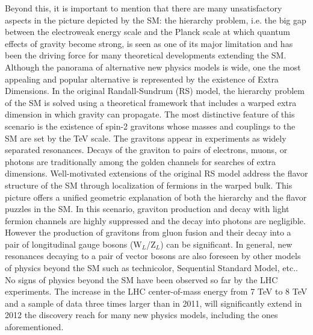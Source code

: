 \documentclass[10pt, a4paper]{article}
\begin{document}
Beyond this, it is important to mention that there are many unsatisfactory 
aspects in the picture depicted by the SM: the hierarchy problem, i.e. the big 
gap between the electroweak energy scale and the Planck scale at which 
quantum effects of gravity become strong, is seen as one of its major limitation 
and has been the driving force for many theoretical developments extending the 
SM. Although the panorama of alternative new physics models is wide, one the 
most appealing and popular alternative is represented by the existence of Extra Dimensions. 
In the original Randall-Sundrum (RS) model, the hierarchy problem
of the SM is solved using a theoretical framework that includes a warped extra dimension
in which gravity can propagate. 
The most distinctive feature of this scenario is the existence of spin-2 gravitons
whose masses and couplings to the SM are set by the TeV scale. The gravitons 
appear in experiments as widely separated resonances. 
Decays of the graviton to pairs of electrons, muons, or photons are traditionally among 
the golden channels for searches of extra dimensions.
Well-motivated extensions of the original RS model address the flavor structure of the SM through 
localization of fermions in the warped bulk. This picture offers a unified geometric explanation 
of both the hierarchy and the flavor puzzles in the SM.
In this scenario, graviton production and decay with light fermion channels are 
highly suppressed and the decay into photons are negligible. 
However the production of gravitons from gluon fusion and 
their decay into a pair of longitudinal gauge bosons (W$_L$/Z$_L$) can be significant.
In general, new resonances decaying to a pair of vector bosons 
are also foreseen by other models of physics beyond the SM such as 
technicolor, Sequential Standard Model, etc.. \\
No signs of physics beyond the SM have been observed so far
by the LHC experiments. The increase in the LHC center-of-mass energy 
from 7 TeV to 8 TeV and a sample of data three times larger than in 2011, 
will significantly extend in 2012 the discovery reach for many new 
physics models, including the ones aforementioned.\\
\end{document}
